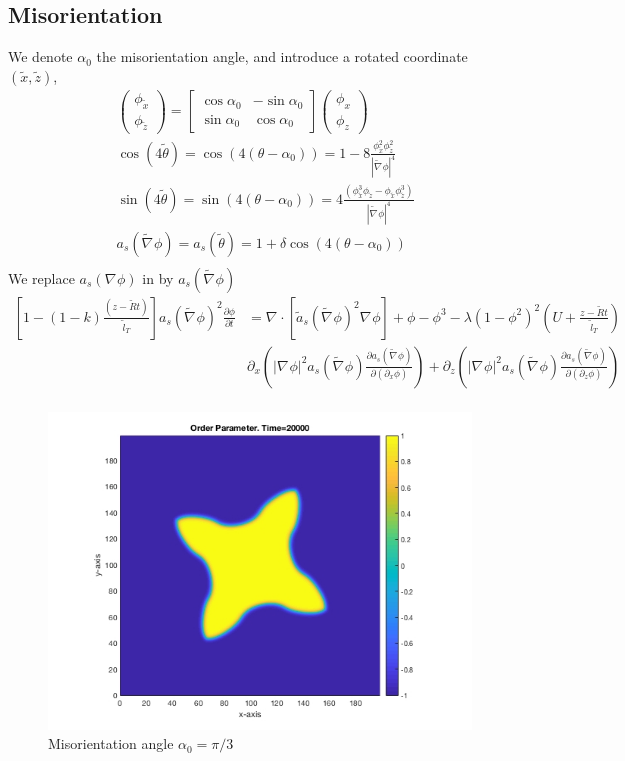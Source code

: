 \documentclass[a4paper,12pt]{article}
\renewcommand{\div}[1]{\nabla_{#1} \cdot}
\newcommand{\grad}[1]{\nabla_{#1}}
\newcommand{\T}[1]{\tilde{#1}}
\newcommand{\WT}[1]{\widetilde{#1}}
\begin{document}
\subsection{Misorientation}
We denote $\alpha_0$ the misorientation angle, and introduce a rotated coordinate $(\T{x},\T{z})$,
\begin{align}
& \left( 
\begin{array}{c}
\phi_{\T{x}} \\ 
\phi_{\T{z}}
\end{array}
\right)
=
\left[
\begin{array}{cc}
\cos \alpha_{0} & -\sin \alpha_{0} \\
\sin \alpha_{0} & \cos \alpha_{0}
\end{array}
\right]
\left( 
\begin{array}{c}
\phi_{x} \\ 
\phi_{z}
\end{array}
\right) \\
& \cos(4\T{\theta}) = \cos(4(\theta-\alpha_0)) =  1- 8 \frac{ \phi_{\T{x}}^2 \phi_{\T{z}}^2 }{|\WT{\grad{}} \phi|^4} \\
& \sin(4\T{\theta}) = \sin(4(\theta-\alpha_0)) =  4 \frac{(\phi_{\T{x}}^3 \phi_{\T{z}} - \phi_{\T{x}} \phi_{\T{z}}^3 )}{| \WT{\grad{}} \phi|^4} \\
& a_s(\WT{\grad{}} \phi  ) = a_s(\T{\theta} )=  1 + \delta \cos(4(\theta-\alpha_0) ) \\
\end{align}
 We replace $a_s(\grad{} \phi)$ in   by $a_s(\widetilde{\grad{}} \phi )$
 \begin{align}
 \left[1-(1-k) \frac{(z- \tilde{R} t)}{ \tilde{l}_T} \right] a_s(\WT{\grad{}} \phi)^2 \frac{\partial \phi}{\partial t} &= 
  \div{} [\tilde{a}_s(\WT{\grad{}} \phi)^2 \grad{} \phi] + \phi - \phi^3 - \lambda (1-\phi^2)^2 \left(U + \frac{z-\tilde{R} t}{ \tilde{l}_T} \right) \nonumber \\
 & \partial_x \left( |\grad{} \phi|^2 a_s(\WT{\grad{}} \phi) \frac{\partial a_s(\WT{\grad{}} \phi)}{\partial (\partial_x \phi)}  \right)  + 
\partial_z \left( |\grad{} \phi|^2 a_s(\WT{\grad{}} \phi) \frac{\partial a_s(\WT{\grad{}} \phi)}{\partial (\partial_z \phi)}  \right)   \nonumber \\
\end{align}

\begin{figure}[h]
\centering
\includegraphics[width=0.5\linewidth]{./figures/misorientation.jpg}
\caption{Misorientation angle $\alpha_0 = \pi/3$}
\end{figure}
\end{document}
